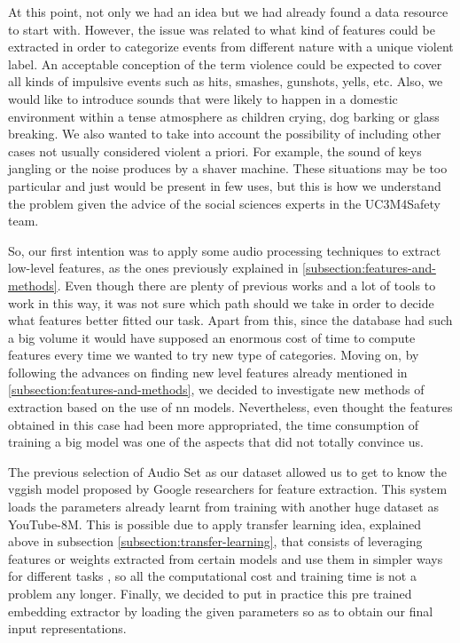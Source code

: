 	At this point, not only we had an idea but we had already found a data resource to start with. However, the issue was related to what kind of features could be extracted in order to categorize events from different nature with a unique violent label. An acceptable conception of the term violence could be expected to cover all kinds of impulsive events such as hits, smashes, gunshots, yells, etc. Also, we would like to introduce sounds that were likely to happen in a domestic environment within a tense atmosphere as children crying, dog barking or glass breaking. We also wanted to take into account the possibility of including other cases not usually considered violent a priori. For example, the sound of keys jangling or the noise produces by a shaver machine. These situations may be too particular and just would be present in few uses, but this is how we understand the problem given the advice of the social sciences experts in the UC3M4Safety team.

	So, our first intention was to apply some audio processing techniques to extract low-level features, as the ones previously explained in \ref{subsection:features-and-methods}. Even though there are plenty of previous works and a lot of tools to work in this way, it was not sure which path should we take in order to decide what features better fitted our task. Apart from this, since the database had such a big volume it would have supposed an enormous cost of time to compute features every time we wanted to try new type of categories. Moving on, by following the advances on finding new level features already mentioned in \ref{subsection:features-and-methods}, we decided to investigate new methods of extraction based on the use of \acrlong{nn} models. Nevertheless, even thought the features obtained in this case had been more appropriated, the time consumption of training a big model was one of the aspects that did not totally convince us.

	The previous selection of Audio Set as our dataset allowed us to get to know the \acrshort{vgg}ish model proposed by Google researchers for feature extraction. This system loads the parameters already learnt from training with another huge dataset as YouTube-8M. This is possible due to apply transfer learning idea, explained above in subsection \ref{subsection:transfer-learning}, that consists of leveraging features or weights extracted from certain models and use them in simpler ways for different tasks \cite{Sarkar2018}, so all the computational cost and training time is not a problem any longer. Finally, we decided to put in practice this pre trained embedding extractor by loading the given parameters so as to obtain our final input representations.

